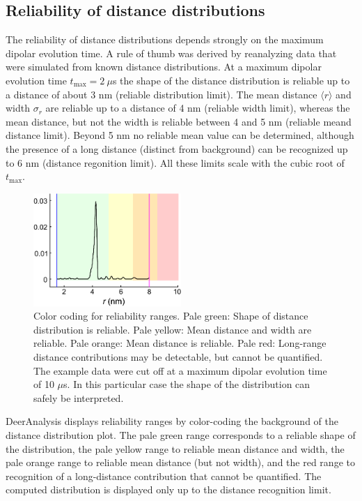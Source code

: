 \documentclass{article}
\begin{document}
\subsection{Reliability of distance distributions}
\label{reliability}
The reliability of distance distributions depends strongly on the maximum dipolar evolution time. 
A rule of thumb was derived by reanalyzing data that were simulated from known distance distributions.
At a maximum dipolar evolution time $t_\mathrm{max} = 2 \ \mu$s the shape of the distance distribution is
reliable up to a distance of about 3 nm (reliable distribution limit). The mean distance $\langle r \rangle$ and width $\sigma_r$ are 
reliable up to a distance of 4 nm (reliable width limit), whereas the mean distance, but not the width is reliable between 4 and 5 nm
(reliable meand distance limit). Beyond 5 nm no reliable mean value can be determined, although the presence of a long distance 
(distinct from background) can be recognized up to 6 nm (distance regonition limit). All these limits scale with the cubic root of $t_\mathrm{max}$.

\begin{figure}[ht]
 	\begin{center}
  \includegraphics[width=0.5\textwidth]{fig_reliability.pdf}
	\end{center}
	\caption{Color coding for reliability ranges. Pale green: Shape of distance distribution is reliable. Pale yellow: Mean distance and width are reliable. Pale orange: Mean distance is reliable. Pale red: Long-range distance contributions may be detectable, but cannot be quantified. The example data were cut off at a maximum dipolar evolution time of 10 $\mu$s. In this particular case the shape of the distribution can safely be interpreted.}
	\label{fig:reliability}
\end{figure}

DeerAnalysis displays reliability ranges by color-coding the background of the distance distribution plot. The pale green range
corresponds to a reliable shape of the distribution, the pale yellow range to reliable mean distance and width, the pale orange range to 
reliable mean distance (but not width), and the red range to recognition of a long-distance contribution that cannot be quantified. The computed distribution is displayed only up to the distance recognition limit.
\end{document}
